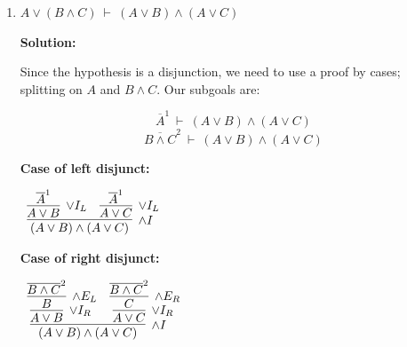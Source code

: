 \documentclass[11pt]{report}
\newcommand{\temp}[2]{{\overline{#2}}^{#1}}
\begin{document}
\begin{enumerate}
\begin{enumerate}
		These subproofs come together with $\lor$-elimination to complete the proof. 

		\begin{scriptsize}
			\begin{center}
				$\begin{array}{c}
					\infer[\lor E]{A \land (B \lor C)}
						{(A \land B) \lor (A \land C)
						&
						\infer[\to I, 1]{(A \land B) \to (A \land (B \lor C))}
							{\infer[\land I]{A \land (B \lor C)}
								{\infer[\land E_{L}]{A}{\temp{1}{A \land B}}
								&
							\infer[\lor I_{L}]{B \lor C}
								{\infer[\land E_{R}]{B}
									{\temp{1}{A \land B}}}}}
						&
						\infer[\to I, 2]{(A \land C) \to (A \land (B \lor C))}
							{\infer[\land I]{A \land (B \lor C)}
								{\infer[\land E_{L}]{A}{\temp{2}{A \land C}}
								&
							\infer[\lor I_{R}]{B \lor C}
								{\infer[\land E_{R}]{C}
									{\temp{2}{A \land C}}}}}}				
				\end{array}$
			\end{center}
		\end{scriptsize}

		\newpage
		\item $A \lor (B \land C) \ \vdash \ (A \lor B) \land (A \lor C)$
		
		\textbf{Solution:}

		Since the hypothesis is a disjunction, we need to use a proof by cases; splitting on $A$ and $B \land C$. Our subgoals are: 

		$$\temp{1}{A} \ \vdash \ (A \lor B) \land (A \lor C) $$
		$$\temp{2}{B \land C} \ \vdash \ (A \lor B) \land (A \lor C) $$

		\textbf{Case of left disjunct:}

		\begin{center}
			$\begin{array}{c}
				\infer[\land I]{(A \lor B) \land (A \lor C)}
					{\infer[\lor I_{L}]{A \lor B}{\temp{1}{A}}
					&
					\infer[\lor I_{L}]{A \lor C}{\temp{1}{A}}}
			\end{array}$
		\end{center}


		\textbf{Case of right disjunct:}

		\begin{center}
			$\begin{array}{c}
				\infer[\land I]{(A \lor B) \land (A \lor C)}
					{\infer[\lor I_{R}]{A \lor B}
						{\infer[\land E_{L}]{B}{\temp{2}{B \land C}}}
					&
					\infer[\lor I_{R}]{A \lor C}
						{\infer[\land E_{R}]{C}{\temp{2}{B \land C}}}}
			\end{array}$
		\end{center}		


\end{enumerate}
\end{enumerate}
\end{document}
